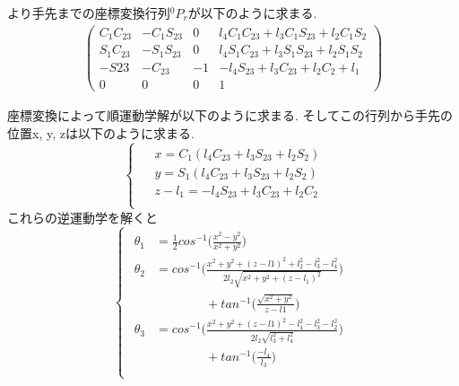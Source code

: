 \documentclass[10pt]{jarticle}
\begin{document}
	より手先までの座標変換行列$^{0}P_{r}$が以下のように求まる.
	\begin{equation*}
	\begin{array}{cc}
		\left( 
			\begin{array}{cccc}
				C_1C_{23} & -C_1S_{23} & 0 & l_4C_1C_{23}+l_3C_1S_{23}+l_2C_1S_2 \\
				S_1C_{23} & -S_1S_{23} & 0 & l_4S_1C_{23}+l_3S_1S_{23}+l_2S_1S_2 \\
				-S{23} & -C_{23} & -1 & -l_4S_{23}+l_3C_{23}+l_2C_2+l_1 \\
				0 & 0 & 0 & 1 
			\end{array}
		\right)
	\end{array}
	\end{equation*}

	座標変換によって順運動学解が以下のように求まる.
	そしてこの行列から手先の位置x, y, zは以下のように求まる.
	\begin{equation}
		\left\{
			\begin{array}{c}
			\begin{split}
				&  x  =  C_1(l_4C_{23}  +  l_3S_{23}  +  l_2S_2)\quad \\
				&  y  =  S_1(l_4C_{23}  +  l_3S_{23}  +  l_2S_2)\quad \\
				&  z  -  l_1  =  -l_4S_{23}  +  l_3C_{23}  +  l_2C_2\quad \\
			\end{split}
		\end{array}
		\right.
	\end{equation}
	これらの逆運動学を解くと
	\begin{equation}
		\left\{
			\begin{array}{c}
			\begin{split}
				\theta_1  &  =\frac{1}{2}  cos^{-1}\biggl( \frac{x^2-y^2}{x^2+y^2} \biggr) \\
				\theta_2  &  = cos^{-1}\biggl( \frac{x^2+y^2+(z-l1)^2  +  l_2^2-l_3^2-l_4^2}{2l_2\sqrt{x^2+y^2+(z-l_1)^2}} \biggr)\\
				&\qquad\qquad  +  tan^{-1}\biggl( \frac{\sqrt{x^2+y^2}}{z-l1}\biggr) \\
				\theta_3  &  =cos^{-1}\biggl( \frac{x^2+y^2+(z-l1)^2 - l_4^2-l_3^2-l_2^2}{2l_2\sqrt{l_3^2+l_4^2}}\biggr)\\
				&\qquad\qquad + tan^{-1}\biggl( \frac{-l_4}{l_3}\biggr)\\
			\end{split}
			\end{array}
		\right.
	\end{equation}
\end{document}
